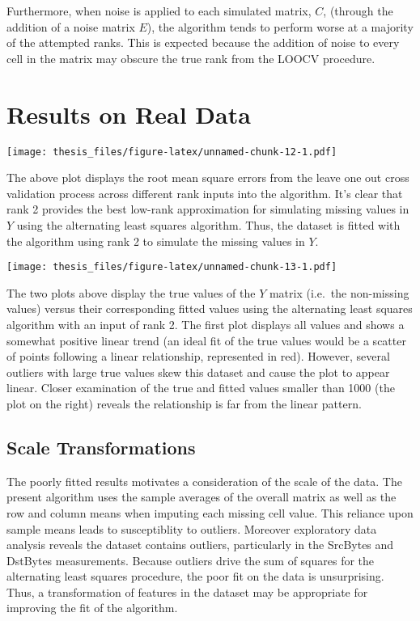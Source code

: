 \documentclass[12pt,twoside]{dukestatscithesis}
\theoremstyle{definition}
\theoremstyle{definition}
\theoremstyle{definition}
\theoremstyle{remark}
\begin{document}
Furthermore, when noise is applied to each simulated matrix, \(C\),
(through the addition of a noise matrix \(E\)), the algorithm tends to
perform worse at a majority of the attempted ranks. This is expected
because the addition of noise to every cell in the matrix may obscure
the true rank from the LOOCV procedure.

\section{Results on Real Data}\label{results-on-real-data}

\texttt{[image: thesis\_files/figure-latex/unnamed-chunk-12-1.pdf]}

The above plot displays the root mean square errors from the leave one
out cross validation process across different rank inputs into the
algorithm. It's clear that rank 2 provides the best low-rank
approximation for simulating missing values in \(Y\) using the
alternating least squares algorithm. Thus, the dataset is fitted with
the algorithm using rank 2 to simulate the missing values in \(Y\).

\texttt{[image: thesis\_files/figure-latex/unnamed-chunk-13-1.pdf]}

The two plots above display the true values of the \(Y\) matrix
(i.e.~the non-missing values) versus their corresponding fitted values
using the alternating least squares algorithm with an input of rank 2.
The first plot displays all values and shows a somewhat positive linear
trend (an ideal fit of the true values would be a scatter of points
following a linear relationship, represented in red). However, several
outliers with large true values skew this dataset and cause the plot to
appear linear. Closer examination of the true and fitted values smaller
than 1000 (the plot on the right) reveals the relationship is far from
the linear pattern.

\subsection{Scale Transformations}\label{scale-transformations}

The poorly fitted results motivates a consideration of the scale of the
data. The present algorithm uses the sample averages of the overall
matrix as well as the row and column means when imputing each missing
cell value. This reliance upon sample means leads to susceptiblity to
outliers. Moreover exploratory data analysis reveals the dataset
contains outliers, particularly in the SrcBytes and DstBytes
measurements. Because outliers drive the sum of squares for the
alternating least squares procedure, the poor fit on the data is
unsurprising. Thus, a transformation of features in the dataset may be
appropriate for improving the fit of the algorithm.
\end{document}

